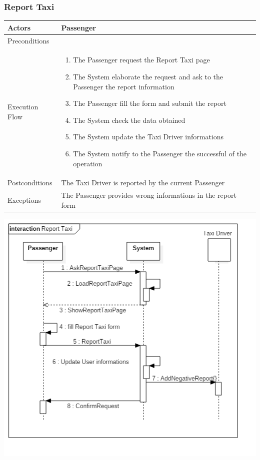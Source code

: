 \documentclass[english]{article}
\begin{document}
\subsubsection{Report Taxi}

\begin{tabular}{lp{8cm}}
\hline
Actors & Passenger \\
\hline
Preconditions & \\
\hline
Execution Flow &  
		\begin{enumerate}
			\item The Passenger request the Report Taxi page
			\item The System elaborate the request and ask to the Passenger the report information
			\item The Passenger fill the form and submit the report
			\item The System check the data obtained
			\item The System update the Taxi Driver informations
			\item The System notify to the Passenger the successful of the operation
		\end{enumerate} 
	\\ 
\hline
Postconditions & The Taxi Driver is reported by the current Passenger \\
\hline
Exceptions & The Passenger provides wrong informations in the report form
\end{tabular}

\includegraphics[width=\textwidth]{ReportTaxi}
\end{document}
